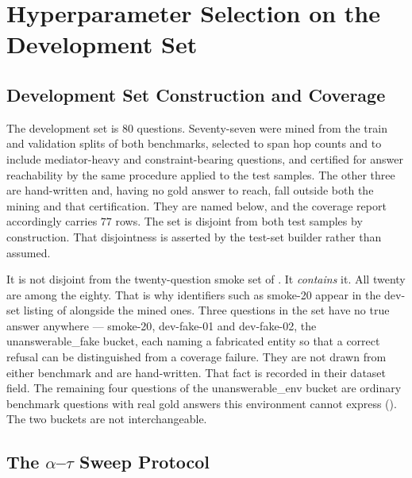 \section{Hyperparameter Selection on the Development Set}\label{sec:hyperparams}

\subsection{Development Set Construction and
Coverage}\label{sec:dev-construction}

The development set is $80$ questions. Seventy-seven were mined from the train
and validation splits of both benchmarks, selected to span hop counts and to
include mediator-heavy and constraint-bearing questions, and certified for
answer reachability by the same procedure applied to the test samples. The other
three are hand-written and, having no gold answer to reach, fall outside both
the mining and that certification. They are named below, and the coverage
report accordingly carries $77$ rows. The set is disjoint from both test
samples by construction. That disjointness is asserted by the test-set builder
rather than assumed.

It is not disjoint from the twenty-question smoke set of
. It \emph{contains} it. All twenty are among the
eighty. That is why identifiers such as \textsf{smoke-20} appear in the dev-set
listing of  alongside the mined ones. Three questions in the
set have no true answer anywhere --- \textsf{smoke-20}, \textsf{dev-fake-01} and
\textsf{dev-fake-02}, the \textsf{unanswerable\_fake} bucket, each naming a
fabricated entity so that a correct refusal can be distinguished from a coverage
failure. They are not drawn from either benchmark and are hand-written. That
fact is recorded in their \textsf{dataset} field. The remaining four questions
of the \textsf{unanswerable\_env} bucket are ordinary benchmark questions with
real gold answers this environment cannot express ().
The two buckets are not interchangeable.

\subsection{The \texorpdfstring{$\alpha$--$\tau$}{alpha-tau} Sweep Protocol}


